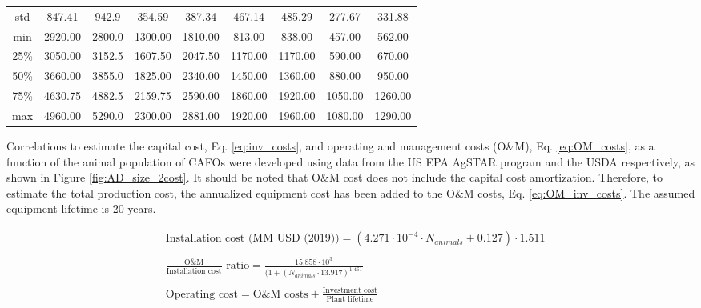 \begin{refsection}[referencesCh4]
\begin{table}[h]
{\begin{tabular}{ccccccccc}
			std   &   847.41 &       942.9 &    354.59 &               387.34 &              467.14 &              485.29 &               277.67 &               331.88    \\      
			min   &   2920.00 &     2800.0 &    1300.00 &              1810.00 &              813.00 &              838.00 &               457.00 &               562.00   \\    
			25\%   &  3050.00 &     3152.5 &    1607.50 &              2047.50 &             1170.00 &             1170.00 &               590.00 &               670.00   \\  
			50\%   & 3660.00 &     3855.0 &     1825.00 &              2340.00 &             1450.00 &             1360.00 &               880.00 &               950.00   \\
			75\%   & 4630.75 &      4882.5 &    2159.75 &              2590.00 &             1860.00 &             1920.00 &              1050.00 &              1260.00   \\
			max   &     4960.00 &   5290.0 &     2300.00 &              2881.00 &             1920.00 &             1960.00 &              1080.00 &              1290.00  \\
			\bottomrule
	\end{tabular}}
\end{table}

Correlations to estimate the capital cost, Eq. \ref{eq:inv_costs}, and operating and management costs (O\&M), Eq. \ref{eq:OM_costs}, as a function of the animal population of CAFOs were developed using data from the US EPA AgSTAR program \citep{AgSTAR2003} and the USDA \citep{USDA_OM} respectively, as shown in Figure \ref{fig:AD_size_2cost}. It should be noted that O\&M cost does not include the capital cost amortization. Therefore, to estimate the total production cost, the annualized equipment cost has been added to the O\&M costs, Eq.  \ref{eq:OM_inv_costs}. The assumed equipment lifetime is 20 years.

\begin{align} 
& \text{Installation cost (MM USD (2019))} = \left(4.271 \cdot 10^{-4} \cdot N_{animals}+0.127\right) \cdot 1.511 \label{eq:inv_costs}\\ \nonumber\\
& \frac{\text{O\&M}} {\text{Installation cost}} \text{ ratio} = \frac{15.858\cdot 10^{3}}{(1+\left(N_{animals} \cdot 13.917\right)^{1.461}} \label{eq:OM_costs}\\ \nonumber\\
& \text{Operating cost} = \text{O\&M costs} + \frac{\text{Investment cost}}{\text{Plant lifetime}} \label{eq:OM_inv_costs}
\end{align}


\end{refsection}
